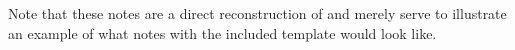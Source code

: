 \documentclass[../notes.tex]{subfile}
\begin{document}
\begin{refsection}

Note that these notes are a direct reconstruction of \cite{StochasticAnalysisNotes} 
and merely serve to illustrate an example of what notes with the included template
would look like. 





\end{refsection}
\end{document}
